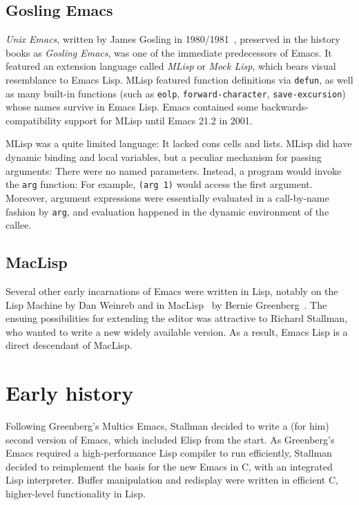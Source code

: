 \documentclass[format=acmsmall, review=false, screen=true]{acmart}
\newcommand \Elisp {Elisp}
\begin{document}
\subsection{Gosling Emacs}

\textit{Unix Emacs}, written by James Gosling in
1980/1981~\cite{Gosling1981}, preserved in the history books
as \textit{Gosling Emacs}, was one of the immediate predecessors of
Emacs.  It featured an extension language called \textit{MLisp} or
\textit{Mock Lisp}, which bears visual resemblance to Emacs Lisp.
MLisp featured function definitions via \texttt{defun}, as well as
many built-in functions (such as \texttt{eolp},
\texttt{forward-character}, \texttt{save-excursion}) whose names
survive in Emacs Lisp.  Emacs contained some backwards-compatibility
support for MLisp until Emacs 21.2 in 2001.

MLisp was a quite limited language: It lacked cons cells and lists.
MLisp did have dynamic binding and local variables, but a peculiar
mechanism for passing arguments:  There were no named
parameters.  Instead, a program would invoke the \texttt{arg}
function: For example, \texttt{(arg 1)} would access the first
argument.  Moreover, argument expressions were essentially evaluated
in a call-by-name fashion by \texttt{arg}, and evaluation happened in
the dynamic environment of the callee.

\subsection{MacLisp}

Several other early incarnations of Emacs were written in Lisp,
notably on the Lisp Machine by Dan Weinreb and in
MacLisp~\cite{Moon1974} by Bernie Greenberg~\cite{Stallman2002}.  The
ensuing possibilities for extending the editor was attractive to
Richard Stallman, who wanted to write a new widely available version.
As a result, Emacs Lisp is a direct descendant of MacLisp.

\section{Early history}         %

Following Greenberg's Multics Emacs, Stallman decided to write a (for
him) second version of Emacs, which included \Elisp{} from the start.
As Greenberg's Emacs required a high-performance Lisp compiler to run
efficiently, Stallman decided to reimplement the basis for the new
Emacs in C, with an integrated Lisp interpreter.  Buffer manipulation
and redisplay were written in efficient C, higher-level functionality
in Lisp.
\end{document}

